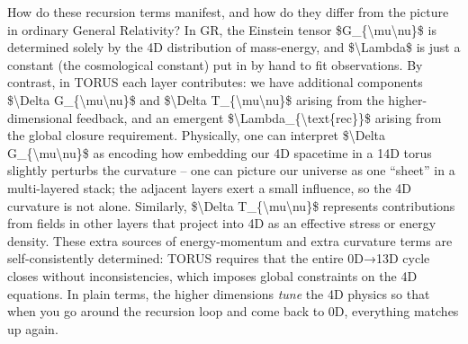 \documentclass[]{article}
\begin{document}
How do these recursion terms manifest, and how do they differ from the
picture in ordinary General Relativity? In GR, the Einstein tensor
\$G\_\{\textbackslash{}mu\textbackslash{}nu\}\$ is determined solely by
the 4D distribution of mass-energy, and \$\textbackslash{}Lambda\$ is
just a constant (the cosmological constant) put in by hand to fit
observations. By contrast, in TORUS each layer contributes: we have
additional components \$\textbackslash{}Delta
G\_\{\textbackslash{}mu\textbackslash{}nu\}\$ and
\$\textbackslash{}Delta T\_\{\textbackslash{}mu\textbackslash{}nu\}\$
arising from the higher-dimensional feedback, and an emergent
\$\textbackslash{}Lambda\_\{\textbackslash{}text\{rec\}\}\$ arising from
the global closure requirement. Physically, one can interpret
\$\textbackslash{}Delta G\_\{\textbackslash{}mu\textbackslash{}nu\}\$ as
encoding how embedding our 4D spacetime in a 14D torus slightly perturbs
the curvature -- one can picture our universe as one ``sheet'' in a
multi-layered stack; the adjacent layers exert a small influence, so the
4D curvature is not alone. Similarly, \$\textbackslash{}Delta
T\_\{\textbackslash{}mu\textbackslash{}nu\}\$ represents contributions
from fields in other layers that project into 4D as an effective stress
or energy density. These extra sources of energy-momentum and extra
curvature terms are self-consistently determined: TORUS requires that
the entire 0D→13D cycle closes without inconsistencies, which imposes
global constraints on the 4D equations. In plain terms, the higher
dimensions \emph{tune} the 4D physics so that when you go around the
recursion loop and come back to 0D, everything matches up again.
\end{document}
